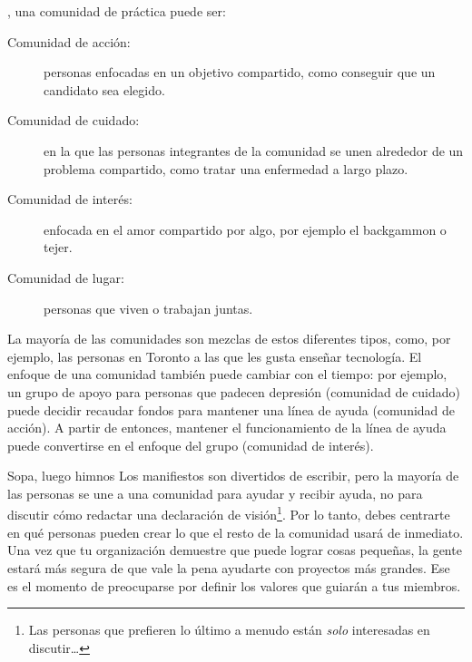 ,
una comunidad de práctica puede ser:

\begin{description}

\item[Comunidad de acción:]
  personas enfocadas en un objetivo compartido,
  como conseguir que un candidato sea elegido.

\item[Comunidad de cuidado:]
 en la que las personas integrantes de la comunidad se unen alrededor de un problema compartido, como tratar una enfermedad a largo plazo.

\item[Comunidad de interés:]
  enfocada en el amor compartido por algo, por ejemplo el backgammon o tejer.

\item[Comunidad de lugar:]
  personas que viven o trabajan juntas.

\end{description}
 
La mayoría de las comunidades son mezclas de estos diferentes tipos,
como, por ejemplo, las personas en Toronto a las que les gusta enseñar tecnología.
El enfoque de una comunidad también puede cambiar con el tiempo:
por ejemplo,
un grupo de apoyo para personas que padecen depresión (comunidad de cuidado)
puede decidir recaudar fondos para mantener una línea de ayuda (comunidad de acción).
A partir de entonces, mantener el funcionamiento de la línea de ayuda puede convertirse en el enfoque del grupo (comunidad de interés).

\begin{aside}{Sopa, luego himnos}
  Los manifiestos son divertidos de escribir,
  pero la mayoría de las personas se une a una comunidad para ayudar y recibir ayuda, 
  no para discutir cómo redactar una declaración de visión\footnote{Las personas que prefieren lo último a menudo están \emph{solo} interesadas en discutir{\ldots}}.
  Por lo tanto, debes centrarte en
  qué personas pueden crear lo que el resto de la comunidad usará de inmediato.
  Una vez que tu organización demuestre que puede lograr cosas pequeñas,
  la gente estará más segura de que vale la pena ayudarte con proyectos más grandes.
  Ese es el momento de preocuparse por definir los valores que guiarán a tus miembros.
\end{aside}


